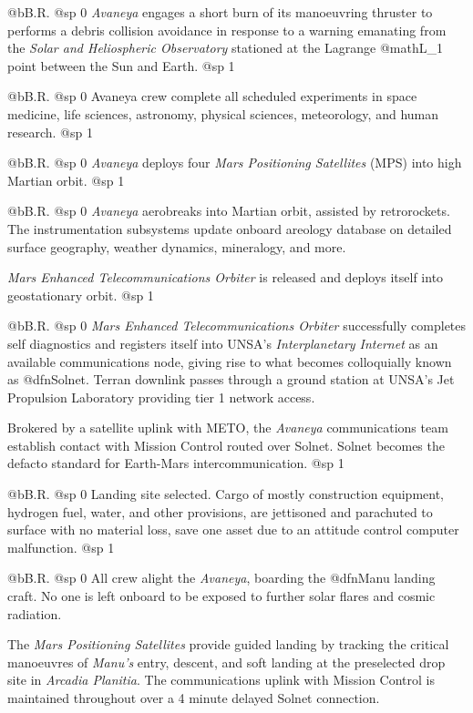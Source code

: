 @b{B.R.}
@sp 0
{\it Avaneya} engages a short burn of its manoeuvring thruster to performs a debris collision avoidance in response to a warning emanating from the {\it Solar and Heliospheric Observatory} stationed at the Lagrange @math{L_1} point between the Sun and Earth.
@sp 1

@b{B.R.}
@sp 0
Avaneya crew complete all scheduled experiments in space medicine, life sciences, astronomy, physical sciences, meteorology, and human research.
@sp 1

@b{B.R.}
@sp 0
{\it Avaneya} deploys four {\it Mars Positioning Satellites} (MPS) into high Martian orbit.
@sp 1

@b{B.R.}
@sp 0
{\it Avaneya} aerobreaks into Martian orbit, assisted by retrorockets. The instrumentation subsystems update onboard areology database on detailed surface geography, weather dynamics, mineralogy, and more.

{\it Mars Enhanced Telecommunications Orbiter} is released and deploys itself into geostationary orbit.
@sp 1

@b{B.R.}
@sp 0
{\it Mars Enhanced Telecommunications Orbiter} successfully completes self diagnostics and registers itself into UNSA's {\it Interplanetary Internet} as an available communications node, giving rise to what becomes colloquially known as @dfn{Solnet}. Terran downlink passes through a ground station at UNSA's Jet Propulsion Laboratory providing tier 1 network access.

Brokered by a satellite uplink with METO, the {\it Avaneya} communications team establish contact with Mission Control routed over Solnet. Solnet becomes the defacto standard for Earth-Mars intercommunication.
@sp 1

@b{B.R.}
@sp 0
Landing site selected. Cargo of mostly construction equipment, hydrogen fuel, water, and other provisions, are jettisoned and parachuted to surface with no material loss, save one asset due to an attitude control computer malfunction.
@sp 1

@b{B.R.}
@sp 0
All crew alight the {\it Avaneya}, boarding the @dfn{Manu} landing craft. No one is left onboard to be exposed to further solar flares and cosmic radiation.

The {\it Mars Positioning Satellites} provide guided landing by tracking the critical manoeuvres of {\it Manu's} entry, descent, and soft landing at the preselected drop site in {\it Arcadia Planitia}. The communications uplink with Mission Control is maintained throughout over a 4 minute delayed Solnet connection.

